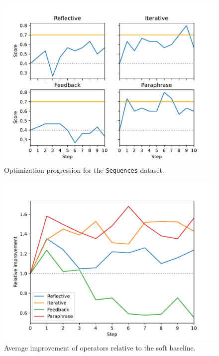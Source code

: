 \begin{table}[htbp]
\begin{tabular}{|c||c|c|c|c|}
    \end{tabular}
\end{table}


\begin{figure}
    \includegraphics[width=\linewidth]{sequences.pdf}
    \caption{Optimization progression for the \texttt{Sequences} dataset.}
    \label{fig:sequences}
\end{figure}

\begin{figure}
    \includegraphics[width=\linewidth]{relative.pdf}
    \caption{Average improvement of operators relative to the soft baseline.}
    \label{fig:relative}
\end{figure}

